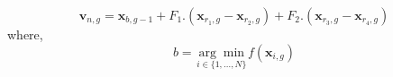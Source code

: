 \begin{equation}
  \mathbf{v}_{n, g}=\mathbf{x}_{b, g-1}
+F_{1}.\left(\mathbf{x}_{r_{1}, g}-\mathbf{x}_{r_{2}, g}\right)
+F_{2}.\left(\mathbf{x}_{r_{3}, g}-\mathbf{x}_{r_{4}, g}\right)
\label{DE-best-2}
\end{equation}
where,
$$
b=\underset{i \in\{1, \ldots, N\}}{\arg \min } f\left(\mathbf{x}_{i, g}\right)
$$